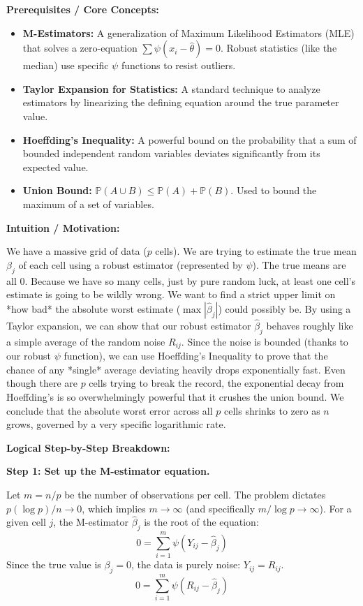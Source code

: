 \begin{solution}
\textbf{Prerequisites / Core Concepts:}
\begin{itemize}
    \item \textbf{M-Estimators:} A generalization of Maximum Likelihood Estimators (MLE) that solves a zero-equation $\sum \psi(x_i - \hat{\theta}) = 0$. Robust statistics (like the median) use specific $\psi$ functions to resist outliers.
    \item \textbf{Taylor Expansion for Statistics:} A standard technique to analyze estimators by linearizing the defining equation around the true parameter value.
    \item \textbf{Hoeffding's Inequality:} A powerful bound on the probability that a sum of bounded independent random variables deviates significantly from its expected value.
    \item \textbf{Union Bound:} $\mathbb{P}(A \cup B) \leq \mathbb{P}(A) + \mathbb{P}(B)$. Used to bound the maximum of a set of variables.
\end{itemize}

\textbf{Intuition / Motivation:}

We have a massive grid of data ($p$ cells). We are trying to estimate the true mean $\beta_j$ of each cell using a robust estimator (represented by $\psi$). The true means are all 0.
Because we have so many cells, just by pure random luck, at least one cell's estimate is going to be wildly wrong. We want to find a strict upper limit on *how bad* the absolute worst estimate ($\max |\hat{\beta}_j|$) could possibly be.
By using a Taylor expansion, we can show that our robust estimator $\hat{\beta}_j$ behaves roughly like a simple average of the random noise $R_{ij}$.
Since the noise is bounded (thanks to our robust $\psi$ function), we can use Hoeffding's Inequality to prove that the chance of any *single* average deviating heavily drops exponentially fast.
Even though there are $p$ cells trying to break the record, the exponential decay from Hoeffding's is so overwhelmingly powerful that it crushes the union bound. We conclude that the absolute worst error across all $p$ cells shrinks to zero as $n$ grows, governed by a very specific logarithmic rate.

\textbf{Logical Step-by-Step Breakdown:}

\textbf{Step 1: Set up the M-estimator equation.}

Let $m = n/p$ be the number of observations per cell. The problem dictates $p(\log p)/n \to 0$, which implies $m \to \infty$ (and specifically $m / \log p \to \infty$).
For a given cell $j$, the M-estimator $\hat{\beta}_j$ is the root of the equation:
\[ 0 = \sum_{i=1}^m \psi(Y_{ij} - \hat{\beta}_j) \]
Since the true value is $\beta_j = 0$, the data is purely noise: $Y_{ij} = R_{ij}$.
\[ 0 = \sum_{i=1}^m \psi(R_{ij} - \hat{\beta}_j) \]


\end{solution}
